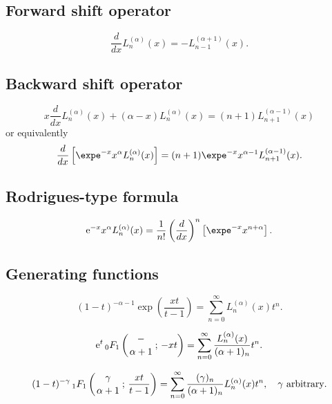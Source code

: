 \documentclass[envcountchap,graybox]{svmono}
\newcommand{\hyp}[5]{\mbox{}_{#1}{F}_{#2}
\left(\genfrac{}{}{0pt}{}{#3}{#4}\,;\,#5\right)}
\newcommand{\e}{\textrm{e}}
\begin{document}
\newpage

\subsection*{Forward shift operator}
\begin{equation}
\label{shift1Laguerre}
\frac{d}{dx}L_n^{(\alpha)}(x)=-L_{n-1}^{(\alpha+1)}(x).
\end{equation}

\subsection*{Backward shift operator}
\begin{equation}
\label{shift2LaguerreI}
x\frac{d}{dx}L_n^{(\alpha)}(x)+(\alpha-x)L_n^{(\alpha)}(x)=(n+1)L_{n+1}^{(\alpha-1)}(x)
\end{equation}
or equivalently
\begin{equation}
\label{shift2LaguerreII}
\frac{d}{dx}\left[\expe^{-x}x^{\alpha}L_n^{(\alpha)}(x)\right]=(n+1)\expe^{-x}x^{\alpha-1}L^{(\alpha-1)}_{n+1}(x).
\end{equation}

\subsection*{Rodrigues-type formula}
\begin{equation}
\label{RodLaguerre}
\e^{-x}x^{\alpha}L_n^{(\alpha)}(x)=\frac{1}{n!}\left(\frac{d}{dx}\right)^n\left[\expe^{-x}x^{n+\alpha}\right].
\end{equation}

\subsection*{Generating functions}
\begin{equation}
\label{GenLaguerre1}
(1-t)^{-\alpha-1}\exp\left(\frac{xt}{t-1}\right)=
\sum_{n=0}^{\infty}L_n^{(\alpha)}(x)t^n.
\end{equation}

\begin{equation}
\label{GenLaguerre2}
\e^t\,\hyp{0}{1}{-}{\alpha+1}{-xt}
=\sum_{n=0}^{\infty}\frac{L_n^{(\alpha)}(x)}{(\alpha+1)_n}t^n.
\end{equation}

\begin{equation}
\label{GenLaguerre3}
(1-t)^{-\gamma}\,\hyp{1}{1}{\gamma}{\alpha+1}{\frac{xt}{t-1}}
=\sum_{n=0}^{\infty}\frac{(\gamma)_n}{(\alpha+1)_n}L_n^{(\alpha)}(x)t^n,
\quad\textrm{$\gamma$ arbitrary}.
\end{equation}
\end{document}
